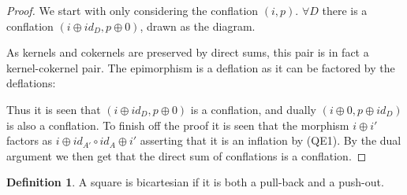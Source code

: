 \documentclass[11pt]{article}
\theoremstyle{definition}
\newtheorem{definition}{Definition}[section]
\theoremstyle{remark}
\begin{document}
            \begin{proof}
                We start with only considering the conflation $(i,p)$. $\forall{D}$ there is a conflation $(i\oplus id_D, p\oplus 0)$, drawn as the diagram.
                \begin{center}
                \end{center}
                As kernels and cokernels are preserved by direct sums, this pair is in fact a kernel-cokernel pair. The epimorphism is a deflation as it can be factored by the deflations:
                \begin{center}
                \end{center}
                Thus it is seen that $(i\oplus id_D, p\oplus 0)$ is a conflation, and dually $(i\oplus 0, p\oplus id_D)$ is also a conflation. To finish off the proof it is seen that the morphism $i\oplus i'$ factors as $i\oplus id_{A'}\circ id_A\oplus i'$ asserting that it is an inflation by (QE1). By the dual argument we then get that the direct sum of conflations is a conflation.
            \end{proof}

            \begin{definition}
                A square is bicartesian if it is both a pull-back and a push-out.
            \end{definition}
\end{document}
